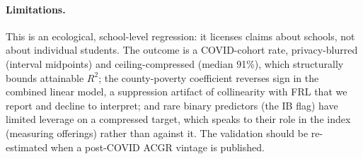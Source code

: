 \paragraph{Limitations.}
This is an ecological, school-level regression: it licenses claims about schools, not about
individual students. The outcome is a COVID-cohort rate, privacy-blurred (interval midpoints)
and ceiling-compressed (median 91\%), which structurally bounds attainable $R^2$; the
county-poverty coefficient reverses sign in the combined linear model, a suppression artifact
of collinearity with FRL that we report and decline to interpret; and rare binary predictors
(the IB flag) have limited leverage on a compressed target, which speaks to their role in the
index (measuring offerings) rather than against it. The validation should be re-estimated
when a post-COVID ACGR vintage is published.

